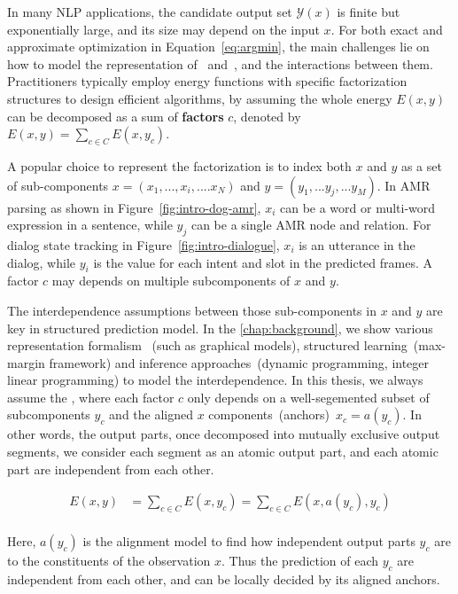In many NLP applications, the candidate output set $\mathcal{Y}(x)$ is
finite but exponentially large, and its size may depend on the input
$x$. For both exact and approximate optimization in
Equation~\ref{eq:argmin}, the main challenges lie on how to model the
representation of \IN~and~\OUT, and the interactions between
them. Practitioners typically employ energy functions with specific
factorization structures to design efficient algorithms, by assuming
the whole energy $E(x, y)$ can be decomposed as a sum of
\textbf{factors} $c$, denoted by $E(x, y) =\sum_{c \in C} E(x, y_{c})$.

A popular choice to represent the factorization is to index both $x$
and $y$ as a set of sub-components $x=(x_{1},..., x_{i},.... x_{N})$
and $y=(y_{1},...y_{j},...y_{M})$. In AMR parsing as shown in
Figure~\ref{fig:intro-dog-amr}, $x_{i}$ can be a word or multi-word
expression in a sentence, while $y_{j}$ can be a single AMR node and
relation.  For dialog state tracking in
Figure~\ref{fig:intro-dialogue}, $x_{i}$ is an utterance in the
dialog, while $y_{i}$ is the value for each intent and slot in the
predicted frames. A factor $c$ may depends on multiple subcomponents
of $x$ and $y$.

The interdependence assumptions between those sub-components in $x$
and $y$ are key in structured prediction model. In the
\autoref{chap:background}, we show various representation formalism
~(such as graphical models), structured learning~(max-margin
framework) and inference approaches~(dynamic programming, integer
linear programming) to model the interdependence. In this thesis, we
always assume the , where each factor
$c$ only depends on a well-segemented subset of subcomponents $y_{c}$
and the aligned $x$ components~(anchors)~$x_{c}=a(y_{c})$. In other
words, the output parts, once decomposed into mutually exclusive
output segments, we consider each segment as an atomic output part,
and each atomic part are independent from each other.

\begin{equation}
    \label{eq:independent-factor}
    \begin{split}
    E(x, y) & =\sum_{c \in C} E(x, y_{c}) = \sum_{c \in C}E(x, a(y_{c}), y_{c})  \\
    \end{split}
\end{equation}

Here, $a(y_{c})$ is the alignment model to find how independent output
parts $y_{c}$ are  to the constituents of the observation
$x$. Thus the prediction of each $y_{c}$ are independent from each
other, and can be locally decided by its aligned anchors.

